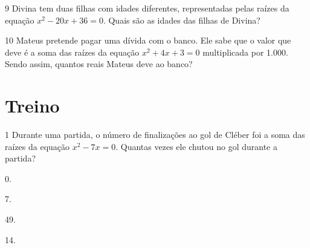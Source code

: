 \num{9} Divina tem duas filhas com idades diferentes, representadas pelas raízes
da equação $x^2 - 20x + 36 = 0$. Quais são as idades das filhas de Divina?

\bigskip









\bigskip

\num{10} Mateus pretende pagar uma dívida com o banco. Ele sabe que o valor que
deve é a soma das raízes da equação $x^2 + 4x + 3 = 0$ multiplicada
por 1.000. Sendo assim, quantos reais Mateus deve ao banco?

\bigskip









\section*{Treino}

\num{1} Durante uma
partida, o número de finalizações ao gol de Cléber foi a soma das raízes da
equação $x^2- 7x = 0.$ Quantas vezes ele chutou no gol durante a
partida?

\begin{escolha}[itemsep=0pt]
\item 0.
\item 7.
\item 49.
\item 14.
\end{escolha}

